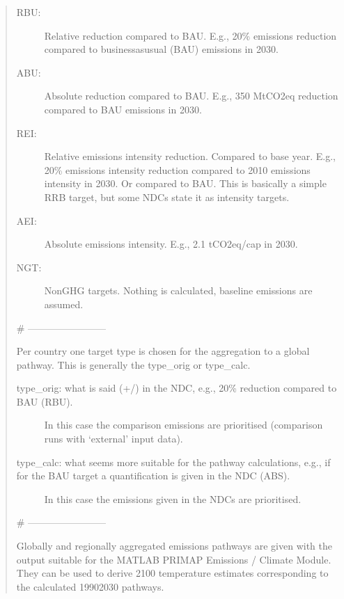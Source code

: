 \documentclass[letterpaper,10pt,english]{sphinxmanual}
\begin{document}
\begin{quote}
\begin{description}
\item[{RBU:}] \leavevmode
Relative reduction compared to BAU.
E.g., 20\% emissions reduction compared to business\sphinxhyphen{}as\sphinxhyphen{}usual (BAU) emissions in 2030.

\item[{ABU:}] \leavevmode
Absolute reduction compared to BAU.
E.g., 350 MtCO2eq reduction compared to BAU emissions in 2030.

\item[{REI:}] \leavevmode
Relative emissions intensity reduction.
Compared to base year. E.g., 20\% emissions intensity reduction compared to 2010 emissions intensity in 2030.
Or compared to BAU. This is basically a simple RRB target, but some NDCs state it as intensity targets.

\item[{AEI:}] \leavevmode
Absolute emissions intensity.
E.g., 2.1 tCO2eq/cap in 2030.

\item[{NGT:}] \leavevmode
Non\sphinxhyphen{}GHG targets.
Nothing is calculated, baseline emissions are assumed.

\end{description}

\# ————————\sphinxhyphen{}

Per country one target type is chosen for the aggregation to a global pathway.
This is generally the type\_orig or type\_calc.
\begin{description}
\item[{type\_orig: what is said (+/\sphinxhyphen{}) in the NDC, e.g., 20\% reduction compared to BAU (RBU).}] \leavevmode
In this case the comparison emissions are prioritised (comparison runs with ‘external’ input data).

\item[{type\_calc: what seems more suitable for the pathway calculations, e.g., if for the BAU target a quantification is given in the NDC (ABS).}] \leavevmode
In this case the emissions given in the NDCs are prioritised.

\end{description}

\# ————————\sphinxhyphen{}

Globally and regionally aggregated emissions pathways are given with the output suitable for the MATLAB PRIMAP Emissions / Climate Module.
They can be used to derive 2100 temperature estimates corresponding to the calculated 1990\sphinxhyphen{}2030 pathways.


\end{quote}
\end{document}
